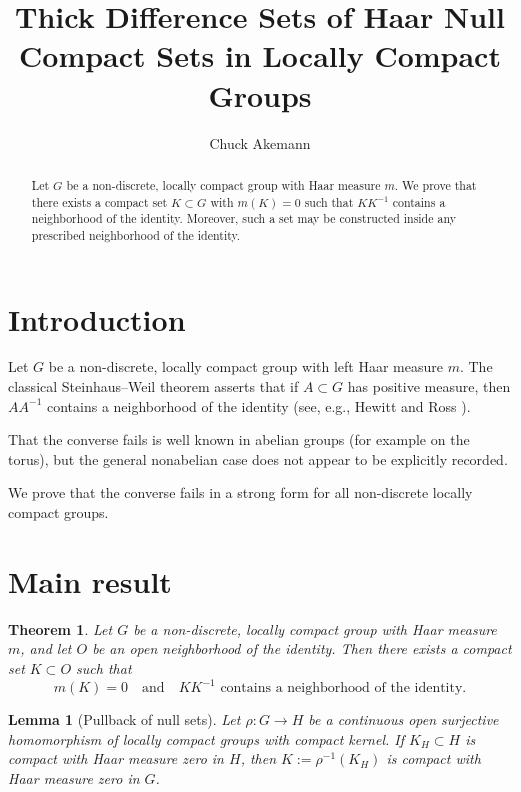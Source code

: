\documentclass[12pt]{amsart}
\title[Thick Difference Sets]{Thick Difference Sets of Haar Null Compact Sets in Locally Compact Groups}
\author{Chuck Akemann}
\newtheorem{theorem}{Theorem}
\newtheorem{lemma}{Lemma}
\begin{document}
\begin{abstract}
Let \(G\) be a non-discrete, locally compact group with Haar measure \(m\).
We prove that there exists a compact set \(K \subset G\) with \(m(K)=0\)
such that \(KK^{-1}\) contains a neighborhood of the identity.
Moreover, such a set may be constructed inside any prescribed
neighborhood of the identity.
\end{abstract}

\maketitle

\section{Introduction}

Let \(G\) be a non-discrete, locally compact group with left Haar measure \(m\).
The classical Steinhaus--Weil theorem asserts that if \(A \subset G\)
has positive measure, then \(AA^{-1}\) contains a neighborhood of the identity
(see, e.g., Hewitt and Ross \cite[Corollary~20.17]{HR}).

That the converse fails is well known in abelian groups (for example on the torus),
but the general nonabelian case does not appear to be explicitly recorded.

We prove that the converse fails in a strong form for all non-discrete locally compact groups.

\section{Main result}

\begin{theorem}\label{thm:main}
Let \(G\) be a non-discrete, locally compact group with Haar measure \(m\),
and let \(O\) be an open neighborhood of the identity.
Then there exists a compact set \(K \subset O\) such that
\[
m(K)=0 \quad \text{and} \quad KK^{-1}
\text{ contains a neighborhood of the identity.}
\]
\end{theorem}

\begin{lemma}[Pullback of null sets]
Let \(\rho : G \to H\) be a continuous open surjective homomorphism of locally compact groups
with compact kernel. If \(K_H \subset H\) is compact with Haar measure zero in \(H\),
then \(K := \rho^{-1}(K_H)\) is compact with Haar measure zero in \(G\).
\end{lemma}
\end{document}
